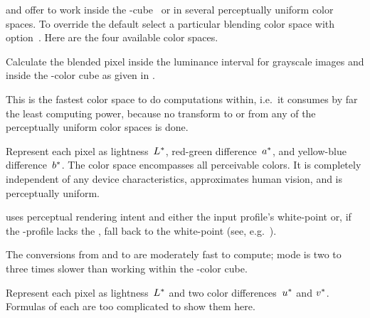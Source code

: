  and  offer to work inside the
-cube~ or in several perceptually uniform color spaces.  To
override the default select a particular blending color space with
option~.  Here are the four
available color spaces.

\begin{description}
\item[Identity Space / \acronym{RGB}-Color Cube]\itemend
  Calculate the blended pixel inside the luminance interval 
  for grayscale images and inside the -color cube as given in
  .

  This is the fastest color space to do computations within, i.e.\ it consumes by far the least
  computing power, because no transform to or from any of the perceptually uniform color spaces
  is done.

\item[\urlmark{\wikipedialabcolorspace}{\acronym{L*a*b*}}]\itemend\urltext
  Represent each pixel as lightness~$L\mbox{${}^{*}$}$, red-green difference~$a\mbox{${}^{*}$}$,
  and yellow-blue difference~$b\mbox{${}^{*}$}$.  The  color space encompasses
  all perceivable colors.  It is completely independent of any device characteristics,
  approximates human vision, and is perceptually uniform.

  \App{} uses perceptual rendering intent and either the input profile's white-point or, if the
  -profile lacks the , fall back to the
   white-point (see,
  e.g.\ ).

  The conversions from and to  are moderately fast to compute; 
  mode is two to three times slower than working within the -color cube.

\item[\urlmark{\wikipediacieluvcolorspace}{\acronym{CIEL*u*v*}}]\itemend\urltext
  Represent each pixel as lightness~$L\mbox{${}^{*}$}$ and two color
  differences~$u\mbox{${}^{*}$}$ and $v\mbox{${}^{*}$}$.  Formulas of each are too complicated
  to show them here.


\end{description}
